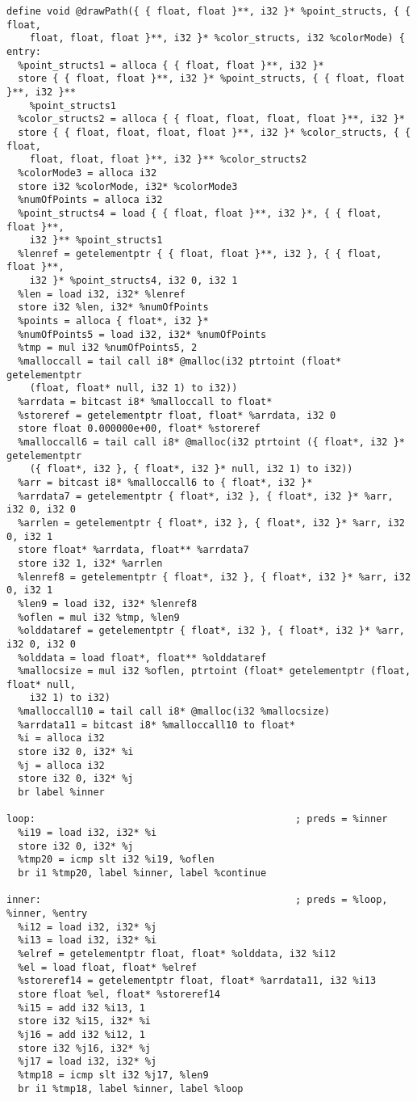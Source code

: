 \documentclass[main.tex]{subfiles}
\begin{document}
{\begin{lstlisting}
define void @drawPath({ { float, float }**, i32 }* %point_structs, { { float,
    float, float, float }**, i32 }* %color_structs, i32 %colorMode) {
entry:
  %point_structs1 = alloca { { float, float }**, i32 }*
  store { { float, float }**, i32 }* %point_structs, { { float, float }**, i32 }**
    %point_structs1
  %color_structs2 = alloca { { float, float, float, float }**, i32 }*
  store { { float, float, float, float }**, i32 }* %color_structs, { { float, 
    float, float, float }**, i32 }** %color_structs2
  %colorMode3 = alloca i32
  store i32 %colorMode, i32* %colorMode3
  %numOfPoints = alloca i32
  %point_structs4 = load { { float, float }**, i32 }*, { { float, float }**,
    i32 }** %point_structs1
  %lenref = getelementptr { { float, float }**, i32 }, { { float, float }**,
    i32 }* %point_structs4, i32 0, i32 1
  %len = load i32, i32* %lenref
  store i32 %len, i32* %numOfPoints
  %points = alloca { float*, i32 }*
  %numOfPoints5 = load i32, i32* %numOfPoints
  %tmp = mul i32 %numOfPoints5, 2
  %malloccall = tail call i8* @malloc(i32 ptrtoint (float* getelementptr
    (float, float* null, i32 1) to i32))
  %arrdata = bitcast i8* %malloccall to float*
  %storeref = getelementptr float, float* %arrdata, i32 0
  store float 0.000000e+00, float* %storeref
  %malloccall6 = tail call i8* @malloc(i32 ptrtoint ({ float*, i32 }* getelementptr
    ({ float*, i32 }, { float*, i32 }* null, i32 1) to i32))
  %arr = bitcast i8* %malloccall6 to { float*, i32 }*
  %arrdata7 = getelementptr { float*, i32 }, { float*, i32 }* %arr, i32 0, i32 0
  %arrlen = getelementptr { float*, i32 }, { float*, i32 }* %arr, i32 0, i32 1
  store float* %arrdata, float** %arrdata7
  store i32 1, i32* %arrlen
  %lenref8 = getelementptr { float*, i32 }, { float*, i32 }* %arr, i32 0, i32 1
  %len9 = load i32, i32* %lenref8
  %oflen = mul i32 %tmp, %len9
  %olddataref = getelementptr { float*, i32 }, { float*, i32 }* %arr, i32 0, i32 0
  %olddata = load float*, float** %olddataref
  %mallocsize = mul i32 %oflen, ptrtoint (float* getelementptr (float, float* null,
    i32 1) to i32)
  %malloccall10 = tail call i8* @malloc(i32 %mallocsize)
  %arrdata11 = bitcast i8* %malloccall10 to float*
  %i = alloca i32
  store i32 0, i32* %i
  %j = alloca i32
  store i32 0, i32* %j
  br label %inner

loop:                                             ; preds = %inner
  %i19 = load i32, i32* %i
  store i32 0, i32* %j
  %tmp20 = icmp slt i32 %i19, %oflen
  br i1 %tmp20, label %inner, label %continue

inner:                                            ; preds = %loop, %inner, %entry
  %i12 = load i32, i32* %j
  %i13 = load i32, i32* %i
  %elref = getelementptr float, float* %olddata, i32 %i12
  %el = load float, float* %elref
  %storeref14 = getelementptr float, float* %arrdata11, i32 %i13
  store float %el, float* %storeref14
  %i15 = add i32 %i13, 1
  store i32 %i15, i32* %i
  %j16 = add i32 %i12, 1
  store i32 %j16, i32* %j
  %j17 = load i32, i32* %j
  %tmp18 = icmp slt i32 %j17, %len9
  br i1 %tmp18, label %inner, label %loop


\end{lstlisting}}
\end{document}
